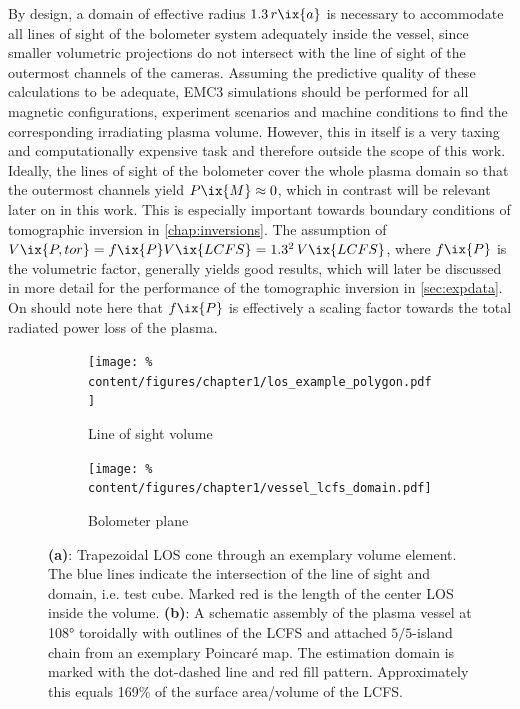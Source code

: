 %
            By design, a domain of effective radius $1.3\,r\ix{a}$ is necessary to accommodate all lines of sight of the bolometer system adequately inside the vessel, since smaller volumetric projections do not intersect with the line of sight of the outermost channels of the cameras. Assuming the predictive quality of these calculations to be adequate, EMC3 simulations should be performed for all magnetic configurations, experiment scenarios and machine conditions to find the corresponding irradiating plasma volume. However, this in itself is a very taxing and computationally expensive task and therefore outside the scope of this work. Ideally, the lines of sight of the bolometer cover the whole plasma domain so that the outermost channels yield $P\ix{M}\approx 0$, which in contrast will be relevant later on in this work. This is especially important towards boundary conditions of tomographic inversion in \cref{chap:inversions}. The assumption of $V\ix{P, tor}=f\ix{P}V\ix{LCFS}=1.3^2\,V\ix{LCFS}$, where $f\ix{P}$ is the volumetric factor, generally yields good results, which will later be discussed in more detail for the performance of the tomographic inversion in \cref{sec:expdata}. On should note here that $f\ix{P}$ is effectively a scaling factor towards the total radiated power loss of the plasma.\\%
%
            \begin{figure}[t]%
                \centering%
                \begin{subfigure}{0.43\textwidth}%
                    \texttt{[image: \%
                        content/figures/chapter1/los\_example\_polygon.pdf]}%
                    \caption{Line of sight volume}\label{fig:los_volume_example}%
                \end{subfigure}%
                \hspace*{1.0cm}%
                \begin{subfigure}{0.52\textwidth}%
                    \texttt{[image: \%
                        content/figures/chapter1/vessel\_lcfs\_domain.pdf]}%
                    \caption{Bolometer plane}\label{fig:domain_schematic}%
                \end{subfigure}%
                \caption{\textbf{(a)}: Trapezoidal LOS cone through an exemplary volume element. The blue lines indicate the intersection of the line of sight and domain, i.e. test cube. Marked red is the length of the center LOS inside the volume. \textbf{(b)}: A schematic assembly of the plasma vessel at 108° toroidally with outlines of the LCFS and attached $5/5$-island chain from an exemplary Poincaré  map. The estimation domain is marked with the dot-dashed line and red fill pattern. Approximately this equals 169\% of the surface area/volume of the LCFS.}\label{fig:torus_domain}%
            \end{figure}%
